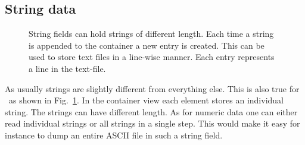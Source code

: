 \subsection{String data}
\begin{figure}[tb]
\centering
\begin{minipage}[c]{0.4\linewidth}
\centering
{}
\end{minipage}
\hfill
\begin{minipage}[c]{0.58\linewidth}
\caption{{\small\label{fig:container_string} String fields can hold strings 
of different length. Each time a string is appended to the container 
a new entry is created. This can be used to store text files in a line-wise
manner. Each entry represents a line in the text-file.}}
\end{minipage}
\end{figure}
As usually strings are slightly different from everything else. 
This is also true for \pninx\ as shown in Fig.~\ref{fig:container_string}.
In the container view each element stores an individual string. The strings 
can have different length. 
As for numeric data one can either read individual strings or all strings 
in a single step. This would make it easy for instance to dump an entire 
ASCII file in such a string field. 

